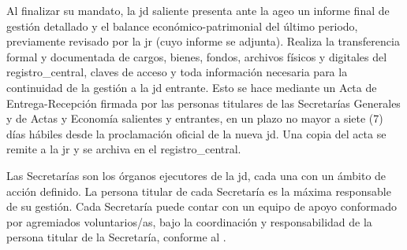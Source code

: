 \documentclass[11pt]{article}
\begin{document}
\begin{artitems}
    \begin{enumerate}
    \end{enumerate}
\end{artitems}

Al finalizar su mandato, la \gls{jd} saliente presenta ante la \gls{ageo} un informe final de gestión detallado y el balance económico-patrimonial del último periodo, previamente revisado por la \gls{jr} (cuyo informe se adjunta). Realiza la transferencia formal y documentada de cargos, bienes, fondos, archivos físicos y digitales del \gls{registro_central}, claves de acceso y toda información necesaria para la continuidad de la gestión a la \gls{jd} entrante. Esto se hace mediante un Acta de Entrega-Recepción firmada por las personas titulares de las Secretarías Generales y de Actas y Economía salientes y entrantes, en un plazo no mayor a siete (7) días hábiles desde la proclamación oficial de la nueva \gls{jd}. Una copia del acta se remite a la \gls{jr} y se archiva en el \gls{registro_central}.


Las Secretarías son los órganos ejecutores de la \gls{jd}, cada una con un ámbito de acción definido. La persona titular de cada Secretaría es la máxima responsable de su gestión. Cada Secretaría puede contar con un equipo de apoyo conformado por \glspl{agremiado} voluntarios/as, bajo la coordinación y responsabilidad de la persona titular de la Secretaría, conforme al .
\end{document}
